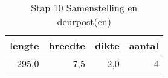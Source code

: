 \begin{table}[h!]
\centering
\caption{Stap 10 Samenstelling en deurpost(en)}
\begin{tabular}{rrrr}
\toprule
 lengte &  breedte &  dikte &  aantal \\
\midrule
  295,0 &      7,5 &    2,0 &       4 \\
\bottomrule
\end{tabular}
\end{table}
